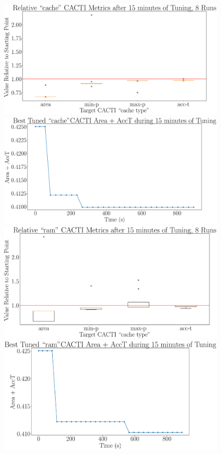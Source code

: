 \documentclass[12pt, a4paper]{article}
\begin{document}
\begin{figure}[htpb]
    \centering
    \begin{minipage}{.48\textwidth}
        \centering
        \includegraphics[width=.8\textwidth]{target_area_plus_acct_900_cache}
    \end{minipage}%
    \begin{minipage}{.48\textwidth}
        \centering
        \includegraphics[width=.8\textwidth]{target_area_plus_acct_900_cache_best}
    \end{minipage}%

    \begin{minipage}{.48\textwidth}
        \centering
        \includegraphics[width=.8\textwidth]{target_area_plus_acct_900_ram}
    \end{minipage}%
    \begin{minipage}{.48\textwidth}
        \centering
        \includegraphics[width=.8\textwidth]{target_area_plus_acct_900_ram_best}
    \end{minipage}%


\end{figure}
\end{document}
